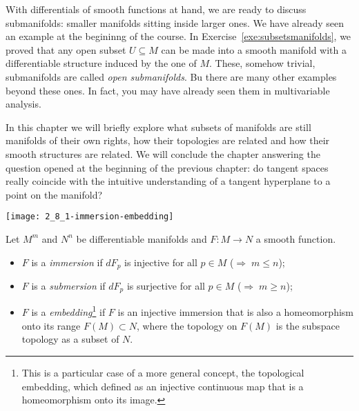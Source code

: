 With differentials of smooth functions at hand, we are ready to discuss submanifolds: smaller manifolds sitting inside larger ones.
We have already seen an example at the begininng of the course.
In Exercise~\ref{exe:subsetsmanifolds}, we proved that any open subset $U\subseteq M$ can be made into a smooth manifold with a differentiable structure induced by the one of $M$.
These, somehow trivial, submanifolds are called \emph{open submanifolds}.
Bu there are many other examples beyond these ones.
In fact, you may have already seen them in multivariable analysis.

In this chapter we will briefly explore what subsets of manifolds are still manifolds of their own rights, how their topologies are related and how their smooth structures are related.
We will conclude the chapter answering the question opened at the beginning of the previous chapter: do tangent spaces really coincide with the intuitive understanding of a tangent hyperplane to a point on the manifold?

\begin{marginfigure}
  \texttt{[image: 2\_8\_1-immersion-embedding]}
\end{marginfigure}
\begin{definition}
  Let $M^m$ and $N^n$ be differentiable manifolds and $F:M\to N$ a smooth function.
  \begin{itemize}
    \item $F$ is a \emph{immersion} if $dF_p$ is injective for all $p\in M$ ($\Rightarrow\; m\leq n$);
    \item $F$ is a \emph{submersion} if $dF_p$ is surjective for all $p\in M$ ($\Rightarrow\; m\geq n$);
    \item $F$ is a \emph{embedding}\footnote{This is a particular case of a more general concept, the topological embedding, which defined as an injective continuous map that is a homeomorphism onto its image.} if $F$ is an injective immersion that is also a homeomorphism onto its range $F(M)\subset N$, where the topology on $F(M)$ is the subspace topology as a subset of $N$.
  \end{itemize}
\end{definition}

